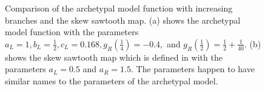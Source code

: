 \begin{figure}
	\centering
	\caption[Comparison of the archetypal model function with increasing branches and the skew sawtooth map]{
		Comparison of the archetypal model function with increasing branches and the skew sawtooth map.
		(a) shows the archetypal model function with the parameters $a_L = 1, b_L = \frac{1}{2}, c_L = 0.168, g_R\left(\frac{1}{4}\right) = -0.4 ,$ and $g_R\left(\frac{1}{2}\right) = \frac{1}{2} + \frac{1}{40}$.
		(b) shows the skew sawtooth map which is defined in \cite{simpson2018saw} with the parameters $a_L = 0.5$ and $a_R = 1.5$.
		The parameters happen to have similar names to the parameters of the archetypal model.
	}
	\label{fig:add.saw.vs.arch}
\end{figure}
